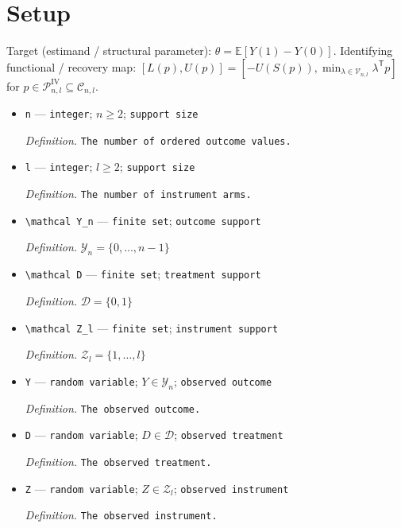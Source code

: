 \documentclass{article}
\begin{document}
\section{Setup}

Target (estimand / structural parameter): \(\theta=\mathbb E[Y(1)-Y(0)]\).
Identifying functional / recovery map: \([L(p),U(p)]=[-U(S(p)),\min_{\lambda\in\mathcal V_{n,l}}\lambda^{\mathsf T}p]\) for \(p\in\mathcal P^{\mathrm{IV}}_{n,l}\subseteq\mathcal C_{n,l}\).
\begin{itemize}
  \item \texttt{n} --- \texttt{integer}; \(n\ge 2\); \texttt{support size}
  \par\smallskip\noindent\emph{Definition.} \texttt{The number of ordered outcome values.}
  \item \texttt{l} --- \texttt{integer}; \(l\ge 2\); \texttt{support size}
  \par\smallskip\noindent\emph{Definition.} \texttt{The number of instrument arms.}
  \item \texttt{\textbackslash{}\allowbreak{}mathcal Y\_\allowbreak{}n} --- \texttt{finite set}; \texttt{outcome support}
  \par\smallskip\noindent\emph{Definition.} \(\mathcal Y_n=\{0,\ldots,n-1\}\)
  \item \texttt{\textbackslash{}\allowbreak{}mathcal D} --- \texttt{finite set}; \texttt{treatment support}
  \par\smallskip\noindent\emph{Definition.} \(\mathcal D=\{0,1\}\)
  \item \texttt{\textbackslash{}\allowbreak{}mathcal Z\_\allowbreak{}l} --- \texttt{finite set}; \texttt{instrument support}
  \par\smallskip\noindent\emph{Definition.} \(\mathcal Z_l=\{1,\ldots,l\}\)
  \item \texttt{Y} --- \texttt{random variable}; \(Y\in\mathcal Y_n\); \texttt{observed outcome}
  \par\smallskip\noindent\emph{Definition.} \texttt{The observed outcome.}
  \item \texttt{D} --- \texttt{random variable}; \(D\in\mathcal D\); \texttt{observed treatment}
  \par\smallskip\noindent\emph{Definition.} \texttt{The observed treatment.}
  \item \texttt{Z} --- \texttt{random variable}; \(Z\in\mathcal Z_l\); \texttt{observed instrument}
  \par\smallskip\noindent\emph{Definition.} \texttt{The observed instrument.}

\end{itemize}
\end{document}

